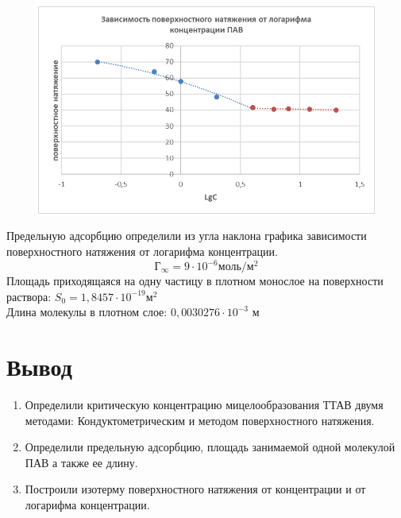 \documentclass[a4paper,12pt]{article} %
\begin{document}
\begin{figure}[h!]
\includegraphics[width=1\textwidth]{image007.png}
\caption{}
\end{figure}
Предельную адсорбцию определили из угла наклона графика зависимости поверхностного натяжения от логарифма концентрации. 
\[\text{Г}_\infty = 9\cdot10^{-6} \text{моль}/\text{м}^2\]
Площадь приходящаяся на одну частицу в плотном монослое на поверхности раствора: 
$S_0 = 1,8457\cdot10^{-19}\text{м}^2$\\
Длина молекулы в плотном слое: $0,0030276\cdot10^{-3}$ м
\newpage
\section{Вывод}
\begin{enumerate}
\item  Определили критическую концентрацию мицелообразования ТТАВ двумя методами: 
Кондуктометрическим и методом поверхностного натяжения. 
\item Определили предельную адсорбцию, площадь занимаемой одной молекулой ПАВ а также ее длину. 
\item Построили изотерму поверхностного натяжения от концентрации и от логарифма концентрации.

\end{enumerate}
\end{document}
